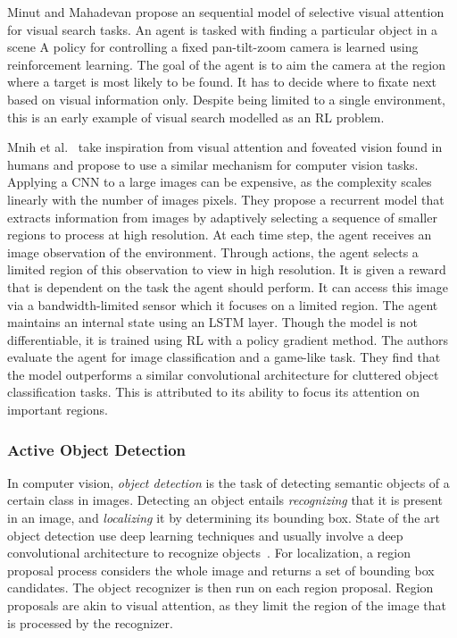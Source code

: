 Minut and Mahadevan\cite{minut_mahadevan_2001} propose an sequential model of selective visual attention for visual search tasks.
An agent is tasked with finding a particular object in a scene
A policy for controlling a fixed pan-tilt-zoom camera is learned using reinforcement learning.
The goal of the agent is to aim the camera at the region where a target is most likely to be found.
It has to decide where to fixate next based on visual information only.
Despite being limited to a single environment, this is an early example of visual search modelled as an RL problem.

Mnih et al.~\cite{mnih_attention_2014} take inspiration from visual attention and foveated vision found in humans and propose to use a similar mechanism for computer vision tasks.
Applying a CNN to a large images can be expensive, as the complexity scales linearly with the number of images pixels.
They propose a recurrent model that extracts information from images by adaptively selecting a sequence of smaller regions to process at high resolution.
At each time step, the agent receives an image observation of the environment.
Through actions, the agent selects a limited region of this observation to view in high resolution.
It is given a reward that is dependent on the task the agent should perform.
It can access this image via a bandwidth-limited sensor which it focuses on a limited region.
The agent maintains an internal state using an LSTM layer.
Though the model is not differentiable, it is trained using RL with a policy gradient method.
The authors evaluate the agent for image classification and a game-like task.
They find that the model outperforms a similar convolutional architecture for cluttered object classification tasks.
This is attributed to its ability to focus its attention on important regions.

\subsubsection{Active Object Detection}

In computer vision, \textit{object detection} is the task of detecting semantic objects of a certain class in images.
Detecting an object entails \textit{recognizing} that it is present in an image, and \textit{localizing} it by determining its bounding box.
State of the art object detection use deep learning techniques and usually involve a deep convolutional architecture to recognize objects~\cite{zhao_objectdetection_2019}.
For localization, a region proposal process considers the whole image and returns a set of bounding box candidates.
The object recognizer is then run on each region proposal.
Region proposals are akin to visual attention, as they limit the region of the image that is processed by the recognizer.

